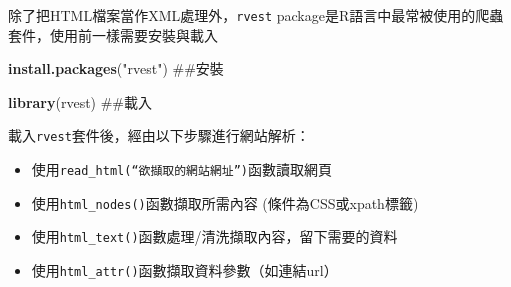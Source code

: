 \documentclass[]{book}
\newenvironment{Shaded}{\begin{snugshade}}{\end{snugshade}}
\newcommand{\KeywordTok}[1]{\textcolor[rgb]{0.13,0.29,0.53}{\textbf{{#1}}}}
\newcommand{\DataTypeTok}[1]{\textcolor[rgb]{0.13,0.29,0.53}{{#1}}}
\newcommand{\StringTok}[1]{\textcolor[rgb]{0.31,0.60,0.02}{{#1}}}
\newcommand{\NormalTok}[1]{{#1}}
\providecommand{\tightlist}{%
  \setlength{\itemsep}{0pt}\setlength{\parskip}{0pt}}
\theoremstyle{definition}
\theoremstyle{definition}
\theoremstyle{remark}
\begin{document}
除了把HTML檔案當作XML處理外，\texttt{rvest}\citep{R-rvest}
package是R語言中最常被使用的爬蟲套件，使用前一樣需要安裝與載入

\begin{Shaded}
\begin{Highlighting}[]
\KeywordTok{install.packages}\NormalTok{(}\StringTok{"rvest"}\NormalTok{) ##安裝}
\end{Highlighting}
\end{Shaded}

\begin{Shaded}
\begin{Highlighting}[]
\KeywordTok{library}\NormalTok{(rvest) ##載入}
\end{Highlighting}
\end{Shaded}

載入\texttt{rvest}套件後，經由以下步驟進行網站解析：

\begin{itemize}
\tightlist
\item
  使用\texttt{read\_html(“欲擷取的網站網址”)}函數讀取網頁
\item
  使用\texttt{html\_nodes()}函數擷取所需內容 (條件為CSS或xpath標籤)
\item
  使用\texttt{html\_text()}函數處理/清洗擷取內容，留下需要的資料
\item
  使用\texttt{html\_attr()}函數擷取資料參數（如連結url）
\end{itemize}

\begin{Shaded}
\end{Shaded}
\end{document}
